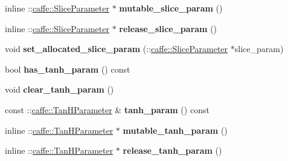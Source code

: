 \begin{DoxyCompactItemize}
\mbox{\label{classcaffe_1_1_v1_layer_parameter_a76e9a2b4ad4c318916bfb31eeb4139b1}} 
inline \+::\mbox{\hyperlink{classcaffe_1_1_slice_parameter}{caffe\+::\+Slice\+Parameter}} $\ast$ {\bfseries mutable\+\_\+slice\+\_\+param} ()
\item 
\mbox{\label{classcaffe_1_1_v1_layer_parameter_a5b0c9138625ed8d3d91f1d5854d05fcd}} 
inline \+::\mbox{\hyperlink{classcaffe_1_1_slice_parameter}{caffe\+::\+Slice\+Parameter}} $\ast$ {\bfseries release\+\_\+slice\+\_\+param} ()
\item 
\mbox{\label{classcaffe_1_1_v1_layer_parameter_a4dd01fc77d2b0bf5554610096902590c}} 
void {\bfseries set\+\_\+allocated\+\_\+slice\+\_\+param} (\+::\mbox{\hyperlink{classcaffe_1_1_slice_parameter}{caffe\+::\+Slice\+Parameter}} $\ast$slice\+\_\+param)
\item 
\mbox{\label{classcaffe_1_1_v1_layer_parameter_ab9b409923395cd1c6ba3dc2a9dd6c36e}} 
bool {\bfseries has\+\_\+tanh\+\_\+param} () const
\item 
\mbox{\label{classcaffe_1_1_v1_layer_parameter_a8c50a7cbb8f6baa502431063b7c71af3}} 
void {\bfseries clear\+\_\+tanh\+\_\+param} ()
\item 
\mbox{\label{classcaffe_1_1_v1_layer_parameter_a12bd7a492c69cd96899d8a0808f727ab}} 
const \+::\mbox{\hyperlink{classcaffe_1_1_tan_h_parameter}{caffe\+::\+Tan\+H\+Parameter}} \& {\bfseries tanh\+\_\+param} () const
\item 
\mbox{\label{classcaffe_1_1_v1_layer_parameter_a0b2fc482d13fde622d41df7ff8ac3d76}} 
inline \+::\mbox{\hyperlink{classcaffe_1_1_tan_h_parameter}{caffe\+::\+Tan\+H\+Parameter}} $\ast$ {\bfseries mutable\+\_\+tanh\+\_\+param} ()
\item 
\mbox{\label{classcaffe_1_1_v1_layer_parameter_aa07909209e5eb4228960d874b52f5394}} 
inline \+::\mbox{\hyperlink{classcaffe_1_1_tan_h_parameter}{caffe\+::\+Tan\+H\+Parameter}} $\ast$ {\bfseries release\+\_\+tanh\+\_\+param} ()

\end{DoxyCompactItemize}
